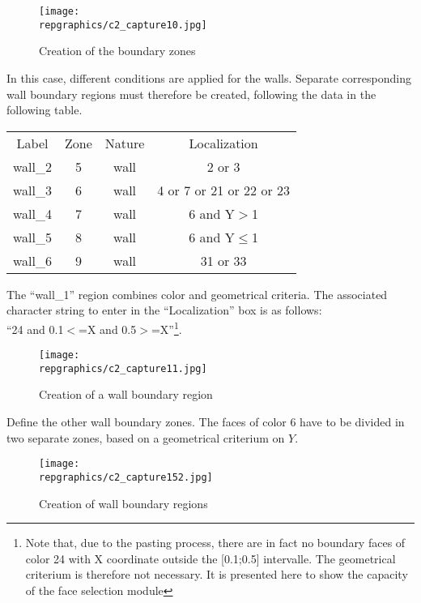 \begin{figure}[h!]
\begin{center}
\texttt{[image: \\repgraphics/c2\_capture10.jpg]} 
\caption{Creation of the boundary zones}
\label{fig10_e2}
\end{center}
\end{figure}


\newpage
In this case, different conditions are applied for the walls. Separate
corresponding wall boundary regions must therefore be created, following the
data in the following table.

\begin{center}
\begin{tabular}{cccc}
Label & Zone & Nature & Localization \\
wall\_2 & 5 & wall & 2 or 3 \\
wall\_3 & 6 & wall & 4 or 7 or 21 or 22 or 23 \\
wall\_4 & 7 & wall & 6 and Y$>$1 \\
wall\_5 & 8 & wall & 6 and Y$\leqslant$1 \\
wall\_6 & 9 & wall & 31 or 33 \\
\end{tabular}
\end{center}

The ``wall\_1'' region combines color and geometrical criteria. The associated
character string to enter in the ``Localization'' box is as follows:\\
``24 and 0.1$<$=X and 0.5$>$=X''\footnote{Note that, due to the pasting process,
there are in fact no boundary faces of color 24 with X coordinate outside the
[0.1;0.5] intervalle. The geometrical criterium is therefore not
necessary. It is presented here to show the capacity of the face selection
module}.

\begin{figure}[h!]
\begin{center}
\texttt{[image: \\repgraphics/c2\_capture11.jpg]} 
\caption{Creation of a wall boundary region}
\label{fig11_e2}
\end{center}
\end{figure}


\newpage
Define the other wall boundary zones. The faces of color 6 have to be divided in
two separate zones, based on a geometrical criterium on $Y$. 

\begin{figure}[h!]
\begin{center}
\texttt{[image: \\repgraphics/c2\_capture152.jpg]} 
\caption{Creation of wall boundary regions}
\label{fig152_e2}
\end{center}
\end{figure}



